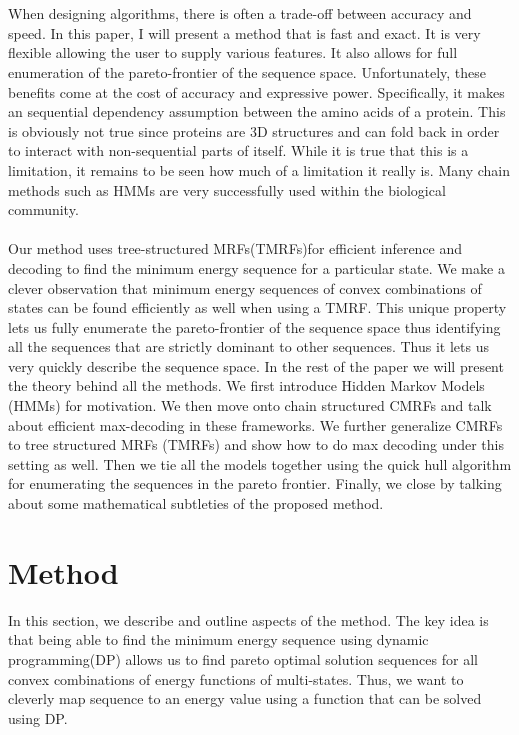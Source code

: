 \documentclass{article}
\begin{document}
\\
\\
When designing algorithms, there is often a trade-off between accuracy and speed. In this paper, I will present a method that is fast and exact. It is very flexible allowing the user to supply various features. It also allows for full enumeration of the pareto-frontier of the sequence space. Unfortunately, these benefits come at the cost of accuracy and expressive power. Specifically, it makes an sequential dependency assumption between the amino acids of a protein. This is obviously not true since proteins are 3D structures and can fold back in order to interact with non-sequential parts of itself. While it is true that this is a limitation, it remains to be seen how much of a limitation it really is. Many chain methods such as HMMs are very successfully used within the biological community. 
\\
\\
Our method uses tree-structured MRFs(TMRFs)for efficient inference and decoding to find the minimum energy sequence for a particular state. We make a clever observation that minimum energy sequences of convex combinations of states can be found efficiently as well when using a TMRF. This unique property lets us fully enumerate the pareto-frontier of the sequence space thus identifying all the sequences that are strictly dominant to other sequences. Thus it lets us very quickly describe the sequence space. In the rest of the paper we will present the theory behind all the methods. We first introduce Hidden Markov Models (HMMs) for motivation. We then move onto chain structured CMRFs and talk about efficient max-decoding in these frameworks. We further generalize CMRFs to tree structured MRFs (TMRFs) and show how to do max decoding under this setting as well. Then we tie all the models together using the quick hull algorithm for enumerating the sequences in the pareto frontier. Finally, we close by talking about some mathematical subtleties of the proposed method.

\section{Method}
In this section, we describe and outline aspects of the method. The key idea is that being able to find the minimum energy sequence using dynamic programming(DP) allows us to find pareto optimal solution sequences for all convex combinations of energy functions of multi-states. Thus, we want to cleverly map sequence to an energy value using a function that can be solved using DP.
\end{document}

